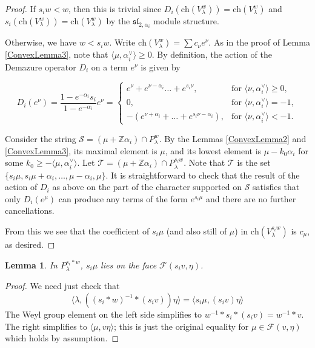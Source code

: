 \documentclass[12pt,reqno]{amsart}
\newcommand{\Z}{\mathbb{Z}}
\newtheorem{lemma}[theorem]{Lemma}
\theoremstyle{definition}
\begin{document}
\begin{proof}
If $s_i w < w$, then this is trivial since $D_{i}\left(\mathrm{ch}(V_\lambda^w)\right)=\mathrm{ch}(V_\lambda^w)$ and $s_i\left(\mathrm{ch}(V_\lambda^w)\right)=\mathrm{ch}(V_\lambda^w)$ by the $\mathfrak{sl}_{2, \alpha_i}$ module structure. 

Otherwise, we have $w < s_i w$. Write $\mathrm{ch}(V_\lambda^w) = \sum c_\nu e^\nu$. As in the proof of Lemma \ref{ConvexLemma3}, note that $\langle \mu, \alpha_i^\vee \rangle \geq 0$. By definition, the action of the Demazure operator $D_i$ on a term $e^\nu$ is given by 

  \[
	D_i(e^{\nu}) = \frac{1-e^{-\alpha_i}s_i}{1-e^{-\alpha_i}}e^\nu=  \begin{cases}
	e^{\nu}+e^{\nu-\alpha_i} \dots + e^{s_i \nu}, & \text{for } \langle \nu, \alpha_i^{\vee} \rangle \geq 0, \\
	0, & \text{for } \langle \nu, \alpha_i^{\vee} \rangle =-1,\\
	-(e^{\nu+ \alpha_i}+ \dots + e^{s_i \nu-\alpha_i}), & \text{for } \langle \nu, \alpha_i^{\vee} \rangle <-1.
	\end{cases} 
	\]


Consider the string $\mathcal{S} = (\mu + \Z \alpha_i) \cap P_\lambda^w$. By the Lemmas \ref{ConvexLemma2} and \ref{ConvexLemma3}, its maximal element is $\mu$, and its lowest element is $\mu - k_0 \alpha_i$ for some $k_0 \ge -\langle \mu, \alpha_i^\vee\rangle$. Let $\mathcal{T} = (\mu + \Z \alpha_i) \cap P_\lambda^{s_iw}$. Note that $\mathcal{T}$ is the set $\{s_i\mu, s_i\mu + \alpha_i, \hdots, \mu - \alpha_i, \mu\}$. It is straightforward to check that the result of the action of $D_{i}$ as above on the part of the character supported on $\mathcal{S}$ satisfies that only $D_i(e^\mu)$ can produce any terms of the form $e^{s_i \mu}$ and there are no further cancellations. 


From this we see that the coefficient of $s_i\mu$ (and also still of $\mu$) in $\mathrm{ch}(V_\lambda^{s_iw})$ is $c_\mu$, as desired. 
\end{proof}

\begin{lemma} \label{InductFace}
In $P^{s_i \ast w}_\lambda$, $s_i\mu$ lies on the face $\mathcal{F}(s_iv, \eta)$.
\end{lemma}
\begin{proof}
We need just check that 
$$
\langle \lambda, ((s_i*w)^{-1}*(s_iv))\eta \rangle = \langle s_i\mu, (s_iv)\eta \rangle
$$
The Weyl group element on the left side simplifies to $w^{-1}*s_i*(s_iv) = w^{-1}*v$. The right simplifies to $\langle \mu, v\eta\rangle$; this is just the original equality for $\mu \in \mathcal{F}(v, \eta)$ which holds by assumption. 
\end{proof}
\end{document}

